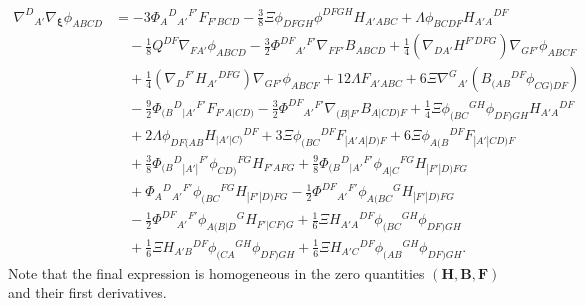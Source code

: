\documentclass[10pt,a4paper]{article}
\theoremstyle{plain}
\def\bmB{{\bm B}}
\def\bmF{{\bm F}}
\def\bmH{{\bm H}}
\begin{document}
\begin{align}
\nabla^D{}_{A'}\nabla_{\bm\xi}\phi_{ABCD}  &= -3 \Phi _{A}{}^{D}{}_{A'}{}^{F'} F_{F'BCD}  - \tfrac{3}{8} \Xi  \phi _{DFGH} \phi ^{DFGH} H_{A'ABC} + \Lambda  \phi _{BCDF} H_{A'A}{}^{DF} \nonumber\\ 
    & \quad- \tfrac{1}{8} Q^{DF} \nabla_{FA'}\phi _{ABCD}   - \tfrac{3}{2} \Phi ^{DF}{}_{A'}{}^{F'} \nabla_{FF'}B_{ABCD} + \tfrac{1}{4} (\nabla_{DA'}H^{F'DFG}) \nabla_{GF'}\phi _{ABCF} \nonumber\\
    &\quad + \tfrac{1}{4} (\nabla_{D}{}^{F'}H_{A'}{}^{DFG}) \nabla_{GF'}\phi _{ABCF}  + 12 \Lambda  F_{A'ABC} +6\Xi \nabla^G{}_{A'}\left( B_{(AB}{}^{DF}\phi_{CG)DF}\right) \nonumber \\
    &\quad - \tfrac{9}{2} \Phi _{(B}{}^{D}{}_{|A'}{}^{F'}F_{F'A|CD)}  - \tfrac{3}{2} \Phi ^{DF}{}_{A'}{}^{F'}\nabla_{(B|F'}B_{A|CD)F} + \tfrac{1}{4} \Xi  \phi _{(BC}{}^{GH}\phi _{DF)GH} H_{A'A}{}^{DF}  \nonumber\\
    &\quad+ 2 \Lambda  \phi_{DF(AB}H_{\vert A'\vert C)}{}^{DF}+ 3 \Xi  \phi _{(BC}{}^{DF}F_{|A'A|D)F} + 6 \Xi  \phi _{A(B}{}^{DF}F_{|A'|CD)F} \nonumber \\
    &\quad  + \tfrac{3}{8} \Phi _{(B}{}^{D}{}_{|A'|}{}^{F'}\phi _{CD)}{}^{FG}H_{F'AFG} + \tfrac{9}{8} \Phi _{(B}{}^{D}{}_{|A'}{}^{F'}\phi _{A|C}{}^{FG}H_{|F'|D)FG} \nonumber\\
    &\quad + \Phi _{A}{}^{D}{}_{A'}{}^{F'}\phi _{(BC}{}^{FG}H_{|F'|D)FG}  - \tfrac{1}{2} \Phi ^{DF}{}_{A'}{}^{F'}\phi _{A(BC}{}^{G}H_{|F'|D)FG} \nonumber \\
    &\quad  - \tfrac{1}{2} \Phi ^{DF}{}_{A'}{}^{F'}\phi _{A(B|D}{}^{G}H_{F'|CF)G}+ \tfrac{1}{6}\Xi H_{A'A}{}^{DF}\phi_{(BC}{}^{GH}\phi_{DF)GH} \nonumber\\
    &\quad + \tfrac{1}{6}\Xi H_{A'B}{}^{DF}\phi_{(CA}{}^{GH}\phi_{DF)GH} + \tfrac{1}{6}\Xi H_{A'C}{}^{DF}\phi_{(AB}{}^{GH}\phi_{DF)GH}. \label{Eq:CollineationIdentity}
\end{align}
Note that the final expression is homogeneous in the zero quantities
$(\bmH, \bmB,\bmF)$ and their first derivatives.\\
\end{document}
